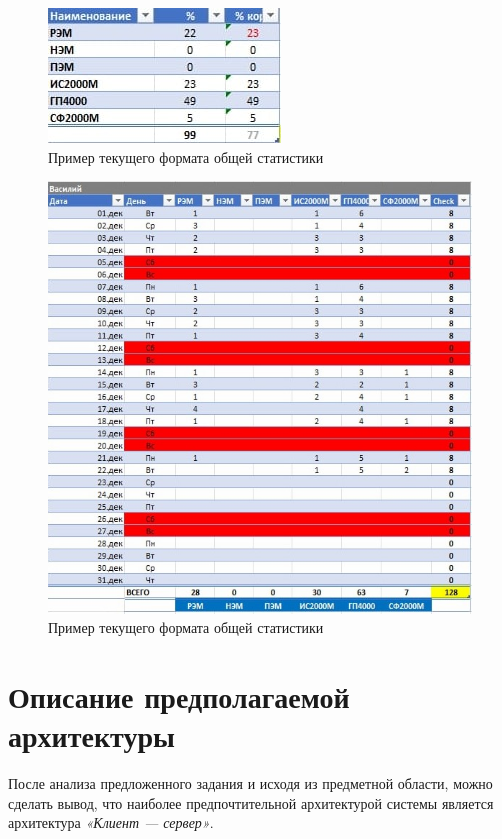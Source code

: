 \begin{figure}[ht!] 
	\center
	\includegraphics [scale=0.7] {my_folder/images//general_statistics}
	\caption{Пример текущего формата общей статистики} 
	\label{fig:general-statistic}  
\end{figure}

\begin{figure}[ht!] 
	\center
	\includegraphics [scale=0.5] {my_folder/images//user_statistics}
	\caption{Пример текущего формата общей статистики} 
	\label{fig:user-statistic}  
\end{figure}


\section{Описание предполагаемой архитектуры} \label{ch1:sec2} 

После анализа предложенного задания и исходя из предметной области, можно сделать вывод, что наиболее предпочтительной архитектурой системы является архитектура 
\textit{«Клиент — сервер»}.

